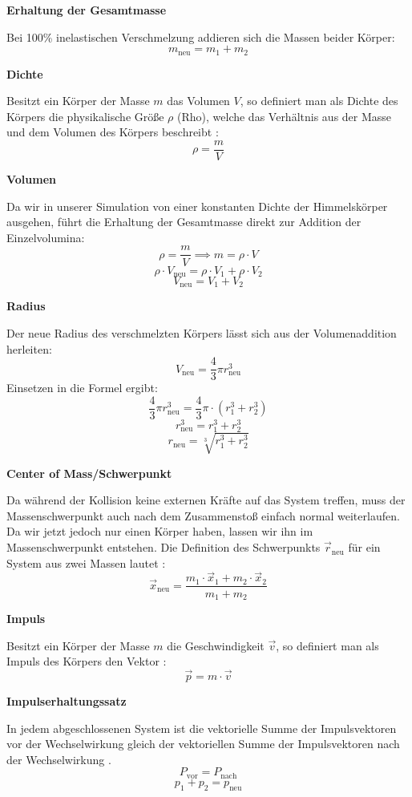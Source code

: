 \documentclass[11pt]{article}
\begin{document}
\textbf{Erhaltung der Gesamtmasse}

Bei 100\% inelastischen Verschmelzung addieren sich die Massen beider
Körper: \[
m_{\text{neu}} = m_1 + m_2
\]

\textbf{Dichte}

Besitzt ein Körper der Masse \(m\) das Volumen \(V\), so definiert man
als Dichte des Körpers die physikalische Größe \(\rho\) (Rho), welche
das Verhältnis aus der Masse und dem Volumen des Körpers beschreibt
\cite{quelle6}: \[\rho = \frac{m}{V}\]

\textbf{Volumen}

Da wir in unserer Simulation von einer konstanten Dichte der
Himmelskörper ausgehen, führt die Erhaltung der Gesamtmasse direkt zur
Addition der Einzelvolumina:
\[\rho = \frac{m}{V} \implies m = \rho \cdot V\]
\[\rho \cdot V_{\text{neu}} = \rho \cdot V_1 + \rho \cdot V_2\]
\[V_{\text{neu}} = V_1 + V_2\]

\textbf{Radius}

Der neue Radius des verschmelzten Körpers lässt sich aus der
Volumenaddition herleiten:
\[V_{\text{neu}} = \frac{4}{3}\pi r_{\text{neu}}^3\] Einsetzen in die
Formel ergibt:
\[\frac{4}{3}\pi r_{\text{neu}}^3 = \frac{4}{3}\pi \cdot \left(r_1^3 + r_2^3\right)\]
\[r_{\text{neu}}^3 = r_1^3 + r_2^3\]
\[r_{\text{neu}} = \sqrt[3]{r_1^3 + r_2^3}\]

\textbf{Center of Mass/Schwerpunkt}

Da während der Kollision keine externen Kräfte auf das System treffen,
muss der Massenschwerpunkt auch nach dem Zusammenstoß einfach normal
weiterlaufen. Da wir jetzt jedoch nur einen Körper haben, lassen wir ihn
im Massenschwerpunkt entstehen. Die Definition des Schwerpunkts
\(\vec{r}_{\text{neu}}\) für ein System aus zwei Massen lautet
\cite{quelle7}:\[\vec{x}_{\text{neu}} = \frac{m_1 \cdot \vec{x}_1 + m_2 \cdot \vec{x}_2}{m_1 + m_2}\]

\textbf{Impuls}

Besitzt ein Körper der Masse \(m\) die Geschwindigkeit \(\vec{v}\), so
definiert man als Impuls des Körpers den Vektor \cite{quelle3}: \[
\vec{p}=m\cdot\vec{v}
\]

\textbf{Impulserhaltungssatz}

In jedem abgeschlossenen System ist die vektorielle Summe der
Impulsvektoren vor der Wechselwirkung gleich der vektoriellen Summe der
Impulsvektoren nach der Wechselwirkung \cite{quelle3}. \[
P_{\text{vor}} = P_{\text{nach}}
\] \[
p_1 + p_2 = p_{\text{neu}}
\]
\end{document}

